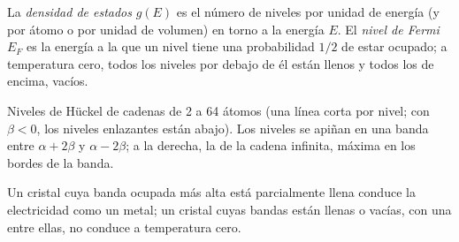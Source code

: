 \begin{definition}\label{def:b3:solid-state:fermi}
La \emph{densidad de estados} $g(E)$ es el número de
niveles por unidad de energía (y por átomo o por unidad de volumen) en torno a la energía $E$.
El \emph{nivel de Fermi} $E_F$ es la energía a la que un nivel tiene
una probabilidad $1/2$ de estar ocupado; a temperatura cero, todos los niveles por debajo de él están
llenos y todos los de encima, vacíos.
\end{definition}

\begin{omfigure}

{\small Niveles de Hückel de cadenas de 2 a 64 átomos (una línea corta por nivel;
con $\beta < 0$, los niveles enlazantes están abajo). Los niveles se apiñan en una banda
entre $\alpha + 2\beta$ y $\alpha - 2\beta$; a la derecha, la  de la cadena
infinita, máxima en los bordes de la banda.}
\end{omfigure}

\begin{proposition}\label{prop:b3:solid-state:filling}
Un cristal cuya banda ocupada más alta está parcialmente llena conduce la electricidad
como un metal; un cristal cuyas bandas están llenas o vacías, con una 
entre ellas, no conduce a temperatura cero.
\end{proposition}

